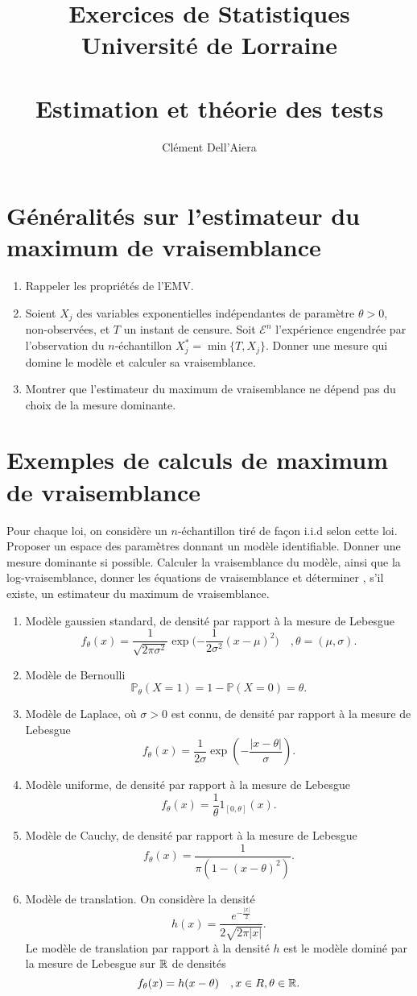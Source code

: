 \documentclass[a4paper]{article}
\title{Exercices de Statistiques  \\ Université de Lorraine \\ ~ \\
\textbf{Estimation et théorie des tests}}
\date{} %
\author{ Clément Dell'Aiera }
\begin{document}
  
\maketitle

\section{Généralités sur l'estimateur du maximum de vraisemblance}
\begin{enumerate}
\item Rappeler les propriétés de l'EMV.
\item Soient $X_j$ des variables exponentielles indépendantes de paramètre $\theta>0$, non-observées, et $T$ un instant de censure. Soit $\mathcal E^n$ l'expérience engendrée par l'observation du $n$-échantillon $X_j^*=\min{\{T,X_j\}}$. Donner une mesure qui domine le modèle et calculer sa vraisemblance.
\item Montrer que l'estimateur du maximum de vraisemblance ne dépend pas du choix de la mesure dominante.  
\end{enumerate}
\section{Exemples de calculs de maximum de vraisemblance}

Pour chaque loi, on considère un $n$-échantillon tiré de façon i.i.d selon cette loi. Proposer un espace des paramètres donnant un modèle identifiable. Donner une mesure dominante si possible. Calculer la vraisemblance du modèle, ainsi que la log-vraisemblance, donner les équations de vraisemblance et déterminer , s'il existe, un estimateur du maximum de vraisemblance.\\

\begin{enumerate}
\item Modèle gaussien standard, de densité par rapport à la mesure de Lebesgue \[f_\theta(x)=\frac{1}{\sqrt{2\pi \sigma^2}} \exp{(-\frac{1}{2\sigma^2}}(x-\mu)^2)\quad, \theta=(\mu,\sigma).\]
\item Modèle de Bernoulli \[\mathbb P_\theta(X=1)=1-\mathbb P(X=0)=\theta.\]
\item Modèle de Laplace, où $\sigma>0$ est connu, de densité par rapport à la mesure de Lebesgue \[f_\theta(x)=\frac{1}{2\sigma}\exp{(-\frac{|x-\theta|}{\sigma})}.\]
\item Modèle uniforme, de densité par rapport à la mesure de Lebesgue \[f_\theta(x)=\frac{1}{\theta}1_{[0,\theta]}(x).\]
\item Modèle de Cauchy, de densité par rapport à la mesure de Lebesgue \[f_\theta(x)=\frac{1}{\pi(1-(x-\theta)^2)}.\]
\item Modèle de translation. On considère la densité \[h(x)=\frac{ e^{-\frac{|x|}{2}}}{2\sqrt{2\pi|x|}}.\] Le modèle de translation par rapport à la densité $h$ est le modèle dominé par la mesure de Lebesgue sur $\mathbb R$ de densités 
\[f_\theta(x)=h(x-\theta)\quad, x\in R,\theta \in \mathbb R.\]
\end{enumerate}
\end{document}
